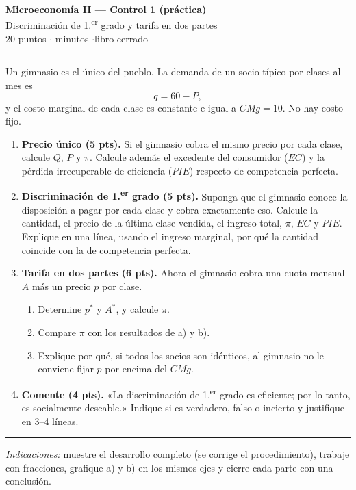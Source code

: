 \documentclass[11pt]{article}
\begin{document}
\begin{center}
{\Large\bfseries Microeconomía II --- Control 1 (práctica)}\\[4pt]
{\large Discriminación de 1.\textsuperscript{er} grado y tarifa en dos partes}\\[4pt]
20 puntos \quad$\cdot$ minutos \quad$\cdot$\quad libro cerrado
\end{center}

\hrule
\medskip

Un gimnasio es el único del pueblo. La demanda de un socio típico por clases al mes es
\[
q = 60 - P ,
\]
y el costo marginal de cada clase es constante e igual a $CMg = 10$. No hay costo fijo.

\begin{enumerate}[label=\alph*), leftmargin=*, itemsep=10pt]

\item \textbf{Precio único (5 pts).} Si el gimnasio cobra el mismo precio por cada clase, calcule $Q$, $P$ y $\pi$. Calcule además el excedente del consumidor ($EC$) y la pérdida irrecuperable de eficiencia ($PIE$) respecto de competencia perfecta.

\item \textbf{Discriminación de 1.\textsuperscript{er} grado (5 pts).} Suponga que el gimnasio conoce la disposición a pagar por cada clase y cobra exactamente eso. Calcule la cantidad, el precio de la última clase vendida, el ingreso total, $\pi$, $EC$ y $PIE$. Explique en una línea, usando el ingreso marginal, por qué la cantidad coincide con la de competencia perfecta.

\item \textbf{Tarifa en dos partes (6 pts).} Ahora el gimnasio cobra una cuota mensual $A$ más un precio $p$ por clase.
\begin{enumerate}[label=\roman*., itemsep=4pt]
  \item Determine $p^{*}$ y $A^{*}$, y calcule $\pi$.
  \item Compare $\pi$ con los resultados de a) y b).
  \item Explique por qué, si todos los socios son idénticos, al gimnasio no le conviene fijar $p$ por encima del $CMg$.
\end{enumerate}

\item \textbf{Comente (4 pts).} «La discriminación de 1.\textsuperscript{er} grado es eficiente; por lo tanto, es socialmente deseable.» Indique si es verdadero, falso o incierto y justifique en 3--4 líneas.

\end{enumerate}

\medskip
\hrule
\smallskip
{\small\textit{Indicaciones:} muestre el desarrollo completo (se corrige el procedimiento), trabaje con fracciones, grafique a) y b) en los mismos ejes y cierre cada parte con una conclusión.}
\end{document}
